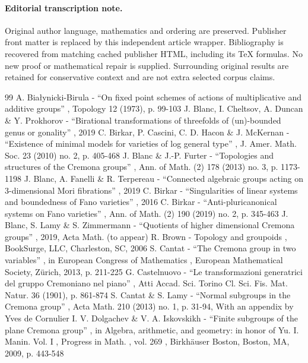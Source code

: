 \documentclass[11pt]{article}
\numberwithin{equation}{section}
\begin{document}
\paragraph{Editorial transcription note.}
Original author language, mathematics and ordering are preserved. Publisher front matter is replaced by this independent article wrapper. Bibliography is recovered from matching cached publisher HTML, including its TeX formulas. No new proof or mathematical repair is supplied. Surrounding original results are retained for conservative context and are not extra selected corpus claims.
\clearpage

\begin{thebibliography}{99}
 A. Białynicki-Birula - “On fixed point schemes of actions of multiplicative and additive groups” , Topology 12 (1973), p. 99-103
 J. Blanc, I. Cheltsov, A. Duncan \& Y. Prokhorov - “Birational transformations of threefolds of (un)-bounded genus or gonality” , 2019
 C. Birkar, P. Cascini, C. D. Hacon \& J. McKernan - “Existence of minimal models for varieties of log general type” , J. Amer. Math. Soc. 23 (2010) no. 2, p. 405-468
 J. Blanc \& J.-P. Furter - “Topologies and structures of the Cremona groups” , Ann. of Math. (2) 178 (2013) no. 3, p. 1173-1198
 J. Blanc, A. Fanelli \& R. Terpereau - “Connected algebraic groups acting on $3$-dimensional Mori fibrations” , 2019
 C. Birkar - “Singularities of linear systems and boundedness of Fano varieties” , 2016
 C. Birkar - “Anti-pluricanonical systems on Fano varieties” , Ann. of Math. (2) 190 (2019) no. 2, p. 345-463
 J. Blanc, S. Lamy \& S. Zimmermann - “Quotients of higher dimensional Cremona groups” , 2019, Acta Math. (to appear)
 R. Brown - Topology and groupoids , BookSurge, LLC, Charleston, SC, 2006
 S. Cantat - “The Cremona group in two variables” , in European Congress of Mathematics , European Mathematical Society, Zürich, 2013, p. 211-225
 G. Castelnuovo - “Le transformazioni generatrici del gruppo Cremoniano nel piano” , Atti Accad. Sci. Torino Cl. Sci. Fis. Mat. Natur. 36 (1901), p. 861-874
 S. Cantat \& S. Lamy - “Normal subgroups in the Cremona group” , Acta Math. 210 (2013) no. 1, p. 31-94, With an appendix by Yves de Cornulier
 I. V. Dolgachev \& V. A. Iskovskikh - “Finite subgroups of the plane Cremona group” , in Algebra, arithmetic, and geometry: in honor of Yu. I. Manin. Vol. I , Progress in Math. , vol. 269 , Birkhäuser Boston, Boston, MA, 2009, p. 443-548

\end{thebibliography}
\end{document}
